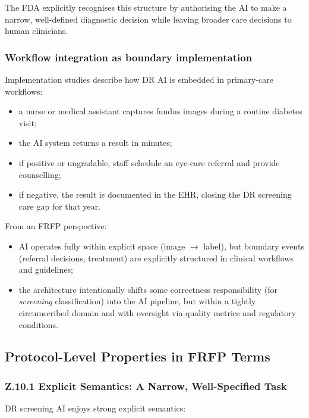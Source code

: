 The FDA explicitly recognises this structure by authorising the AI to make a
narrow, well-defined diagnostic decision while leaving broader care
decisions to human clinicians.

\subsubsection*{Workflow integration as boundary implementation}

Implementation studies describe how DR AI is embedded in primary-care
workflows:

\begin{itemize}
  \item a nurse or medical assistant captures fundus images during a routine
        diabetes visit;
  \item the AI system returns a result in minutes;
  \item if positive or ungradable, staff schedule an eye-care referral and
        provide counselling;
  \item if negative, the result is documented in the EHR, closing the DR
        screening care gap for that year.
\end{itemize}

From an FRFP perspective:

\begin{itemize}
  \item AI operates fully within explicit space (image $\to$ label), but
        boundary events (referral decisions, treatment) are explicitly
        structured in clinical workflows and guidelines;
  \item the architecture intentionally shifts some correctness
        responsibility (for \emph{screening} classification) into the AI
        pipeline, but within a tightly circumscribed domain and with
        oversight via quality metrics and regulatory conditions.
\end{itemize}

\subsection{Protocol-Level Properties in FRFP Terms}

\subsubsection*{Z.10.1 Explicit Semantics:
  A Narrow, Well-Specified Task}

DR screening AI enjoys strong explicit semantics:

